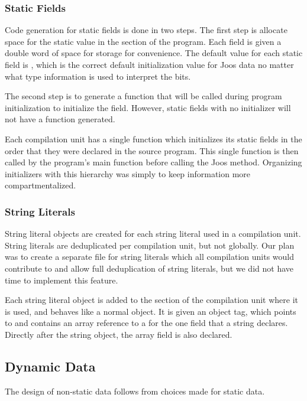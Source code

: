 \documentclass[pdftex,11pt,a4paper]{article}
\begin{document}
\subsubsection{Static Fields}

Code generation for static fields is done in two steps. The first step
is allocate space for the static value in the  section of
the program. Each field is given a double word of space for storage
for convenience. The default value for each static field is ,
which is the correct default initialization value for Joos data no
matter what type information is used to interpret the bits.

The second step is to generate a function that will be called during
program initialization to initialize the field. However, static fields
with no initializer will not have a function generated.

Each compilation unit has a single function which initializes its
static fields in the order that they were declared in the source
program. This single function is then called by the program's main
function before calling the Joos  method. Organizing
initializers with this hierarchy was simply to keep information more
compartmentalized.

\subsubsection{String Literals}

String literal objects are created for each string literal used in a
compilation unit. String literals are deduplicated per compilation
unit, but not globally. Our plan was to create a separate file for
string literals which all compilation units would contribute to and
allow full deduplication of string literals, but we did not have time
to implement this feature.

Each string literal object is added to the  section of the
compilation unit where it is used, and behaves like a normal
object. It is given an object tag, which points to
 and contains an array reference to a
 for the one field that a string declares. Directly after
the string object, the array field is also declared.

\subsection{Dynamic Data}

The design of non-static data follows from choices made for static
data.
\end{document}

